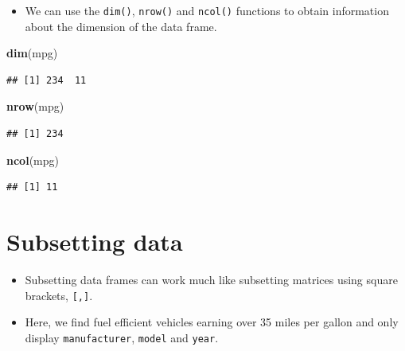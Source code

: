 \documentclass[]{book}
\newenvironment{Shaded}{\begin{snugshade}}{\end{snugshade}}
\newcommand{\KeywordTok}[1]{\textcolor[rgb]{0.13,0.29,0.53}{\textbf{#1}}}
\newcommand{\DecValTok}[1]{\textcolor[rgb]{0.00,0.00,0.81}{#1}}
\newcommand{\StringTok}[1]{\textcolor[rgb]{0.31,0.60,0.02}{#1}}
\newcommand{\OperatorTok}[1]{\textcolor[rgb]{0.81,0.36,0.00}{\textbf{#1}}}
\newcommand{\NormalTok}[1]{#1}
\providecommand{\tightlist}{%
  \setlength{\itemsep}{0pt}\setlength{\parskip}{0pt}}
\begin{document}
\begin{itemize}
\tightlist
\item
  We can use the \texttt{dim()}, \texttt{nrow()} and \texttt{ncol()}
  functions to obtain information about the dimension of the data frame.
\end{itemize}

\begin{Shaded}
\begin{Highlighting}[]
\KeywordTok{dim}\NormalTok{(mpg)}
\end{Highlighting}
\end{Shaded}

\begin{verbatim}
## [1] 234  11
\end{verbatim}

\begin{Shaded}
\begin{Highlighting}[]
\KeywordTok{nrow}\NormalTok{(mpg)}
\end{Highlighting}
\end{Shaded}

\begin{verbatim}
## [1] 234
\end{verbatim}

\begin{Shaded}
\begin{Highlighting}[]
\KeywordTok{ncol}\NormalTok{(mpg)}
\end{Highlighting}
\end{Shaded}

\begin{verbatim}
## [1] 11
\end{verbatim}

\section{Subsetting data}\label{subsetting-data}

\begin{itemize}
\tightlist
\item
  Subsetting data frames can work much like subsetting matrices using
  square brackets, \texttt{{[},{]}}.
\item
  Here, we find fuel efficient vehicles earning over 35 miles per gallon
  and only display \texttt{manufacturer}, \texttt{model} and
  \texttt{year}.
\end{itemize}

\begin{Shaded}
\end{Shaded}
\end{document}
